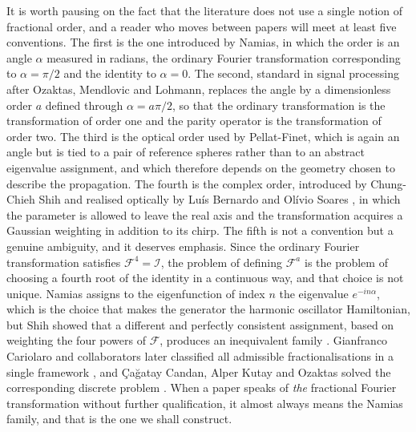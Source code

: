		It is worth pausing on the fact that the literature does not use a single notion of fractional order, and a reader who moves between papers will meet at least five conventions. The first is the one introduced by Namias, in which the order is an angle $\alpha$ measured in radians, the ordinary Fourier transformation corresponding to $\alpha = \pi/2$ and the identity to $\alpha = 0$. The second, standard in signal processing after Ozaktas, Mendlovic and Lohmann, replaces the angle by a dimensionless order $a$ defined through $\alpha = a\pi/2$, so that the ordinary transformation is the transformation of order one and the parity operator is the transformation of order two. The third is the optical order used by Pellat-Finet, which is again an angle but is tied to a pair of reference spheres rather than to an abstract eigenvalue assignment, and which therefore depends on the geometry chosen to describe the propagation. The fourth is the complex order, introduced by Chung-Chieh Shih \citeyearpar{shih1995optical} and realised optically by Lu\'is Bernardo and Ol\'ivio Soares \citeyearpar{bernardo1996optical}, in which the parameter is allowed to leave the real axis and the transformation acquires a Gaussian weighting in addition to its chirp. The fifth is not a convention but a genuine ambiguity, and it deserves emphasis. Since the ordinary Fourier transformation satisfies $\mathcal{F}^{4} = \mathcal{I}$, the problem of defining $\mathcal{F}^{a}$ is the problem of choosing a fourth root of the identity in a continuous way, and that choice is not unique. Namias assigns to the eigenfunction of index $n$ the eigenvalue $e^{-in\alpha}$, which is the choice that makes the generator the harmonic oscillator Hamiltonian, but Shih showed that a different and perfectly consistent assignment, based on weighting the four powers of $\mathcal{F}$, produces an inequivalent family \citep{shih1995fractionalization}. Gianfranco Cariolaro and collaborators later classified all admissible fractionalisations in a single framework \citep{cariolaro1998unified}, and \c{C}a\u{g}atay Candan, Alper Kutay and Ozaktas solved the corresponding discrete problem \citep{candan2000discrete}. When a paper speaks of \textit{the} fractional Fourier transformation without further qualification, it almost always means the Namias family, and that is the one we shall construct.

